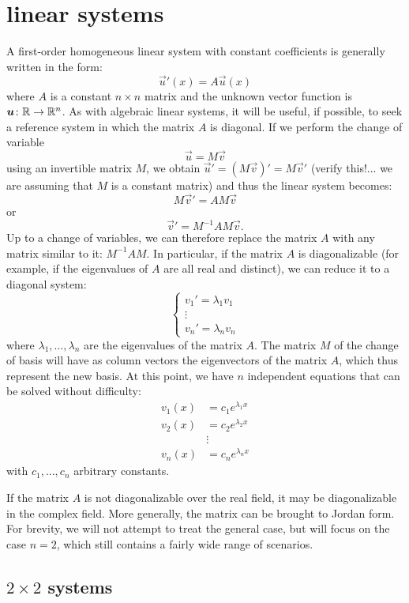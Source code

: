 \section{linear systems}

A first-order homogeneous linear system with constant coefficients is generally
written in the form:
\[
  \vec u'(x) = A \vec u(x)
\]
where $A$ is a constant $n\times n$ matrix and the unknown vector function is
$\boldsymbol u \colon {\mathbb R}\to {\mathbb R}^n$. As with algebraic linear systems, it will be
useful, if possible, to seek a reference system in which the matrix $A$ is
diagonal. If we perform the change of variable
\[
  \vec u = M \vec v
\]
using an invertible matrix $M$, we obtain $\vec u' = (M \vec v)' = M \vec v'$
(verify this!... we are assuming that $M$ is a constant matrix) and thus the
linear system becomes:
\[
 M \vec v' = A M \vec v
\]
or
\[
  \vec v' = M^{-1} A M \vec v.
\]
Up to a change of variables, we can therefore replace the matrix $A$ with any
matrix similar to it: $M^{-1} A M$. In particular, if the matrix $A$ is
diagonalizable (for example, if the eigenvalues of $A$ are all real and
distinct), we can reduce it to a diagonal system:
\[
\begin{cases}
 v_1' = \lambda_1 v_1 \\
      \vdots\\
 v_n' = \lambda_n v_n
\end{cases}
\]
where $\lambda_1, \dots, \lambda_n$ are the eigenvalues of the matrix $A$. The
matrix $M$ of the change of basis will have as column vectors the eigenvectors
of the matrix $A$, which thus represent the new basis. At this point, we have
$n$ independent equations that can be solved without difficulty:
\begin{align*}
  v_1(x) &= c_1 e^{\lambda_1 x}\\
  v_2(x) &= c_2 e^{\lambda_2 x}\\
  &\vdots \\
  v_n(x) &= c_n e^{\lambda_n x}
\end{align*}
with $c_1, \dots, c_n$ arbitrary constants.

If the matrix $A$ is not diagonalizable over the real field, it may be
diagonalizable in the complex field. More generally, the matrix can be brought
to Jordan form. For brevity, we will not attempt to treat the general case, but
will focus on the case $n=2$, which still contains a fairly wide range of
scenarios.

\subsection{$2\times 2$ systems}

